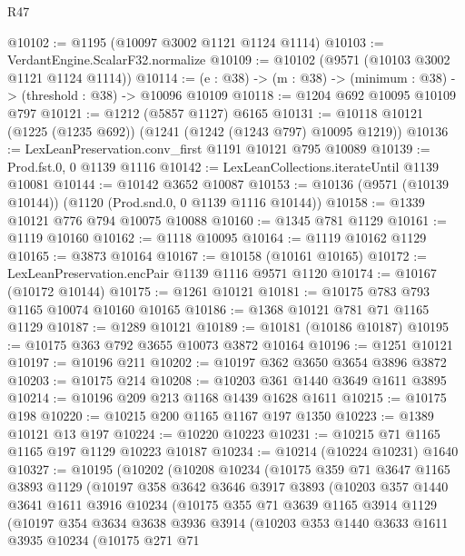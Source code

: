 \begin{lexlean}{R47}
\begin{coremodule}
@10102 := @1195 (@10097 @3002 @1121 @1124 @1114)
@10103 := VerdantEngine.ScalarF32.normalize
@10109 := @10102 (@9571 (@10103 @3002 @1121 @1124 @1114))
@10114 := (e : @38) -> (m : @38) -> (minimum : @38) -> (threshold : @38) -> @10096 @10109
@10118 := @1204 @692 @10095 @10109 @797
@10121 := @1212 (@5857 @1127) @6165
@10131 := @10118 @10121 (@1225 (@1235 @692)) (@1241 (@1242 (@1243 @797) @10095 @1219))
@10136 := LexLeanPreservation.conv_first @1191 @10121 @795 @10089
@10139 := Prod.fst.{0, 0} @1139 @1116
@10142 := LexLeanCollections.iterateUntil @1139 @10081
@10144 := @10142 @3652 @10087
@10153 := @10136 (@9571 (@10139 @10144)) (@1120 (Prod.snd.{0, 0} @1139 @1116 @10144))
@10158 := @1339 @10121 @776 @794 @10075 @10088
@10160 := @1345 @781 @1129
@10161 := @1119 @10160
@10162 := @1118 @10095
@10164 := @1119 @10162 @1129
@10165 := @3873 @10164
@10167 := @10158 (@10161 @10165)
@10172 := LexLeanPreservation.encPair @1139 @1116 @9571 @1120
@10174 := @10167 (@10172 @10144)
@10175 := @1261 @10121
@10181 := @10175 @783 @793 @1165 @10074 @10160 @10165
@10186 := @1368 @10121 @781 @71 @1165 @1129
@10187 := @1289 @10121
@10189 := @10181 (@10186 @10187)
@10195 := @10175 @363 @792 @3655 @10073 @3872 @10164
@10196 := @1251 @10121
@10197 := @10196 @211
@10202 := @10197 @362 @3650 @3654 @3896 @3872
@10203 := @10175 @214
@10208 := @10203 @361 @1440 @3649 @1611 @3895
@10214 := @10196 @209 @213 @1168 @1439 @1628 @1611
@10215 := @10175 @198
@10220 := @10215 @200 @1165 @1167 @197 @1350
@10223 := @1389 @10121 @13 @197
@10224 := @10220 @10223
@10231 := @10215 @71 @1165 @1165 @197 @1129 @10223 @10187
@10234 := @10214 (@10224 @10231) @1640
@10327 := @10195
    (@10202
      (@10208
        @10234
        (@10175
          @359
          @71
          @3647
          @1165
          @3893
          @1129
          (@10197
            @358
            @3642
            @3646
            @3917
            @3893
            (@10203
              @357
              @1440
              @3641
              @1611
              @3916
              @10234
              (@10175
                @355
                @71
                @3639
                @1165
                @3914
                @1129
                (@10197
                  @354
                  @3634
                  @3638
                  @3936
                  @3914
                  (@10203
                    @353
                    @1440
                    @3633
                    @1611
                    @3935
                    @10234
                    (@10175
                      @271
                      @71

\end{coremodule}
\end{lexlean}
